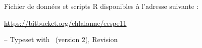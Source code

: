
{\centering {}\par}


\foilhead{}

Fichier de données et scripts R disponibles à l'adresse suivante :\newline
{\centering \url{https://bitbucket.org/chlalanne/eespe11}\par}
\vfill

\raggedleft \scriptsize -- Typeset with \FoilTeX\ (version 2), Revision \VCRevision


